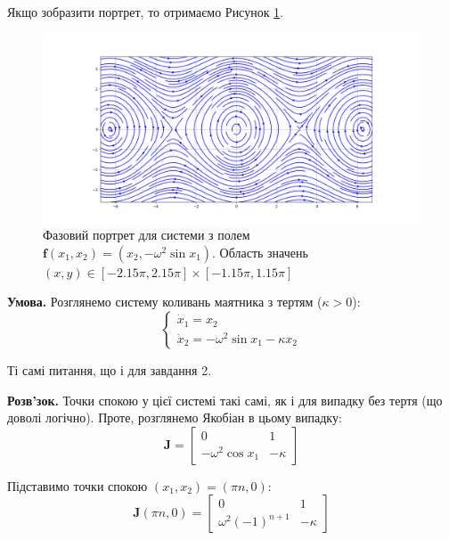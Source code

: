 \documentclass[oneside,solution]{tmpl}
\begin{document}
Якщо зобразити портрет, то отримаємо Рисунок \ref{fig:no_friction}.

\begin{figure}
    \centering
    \includegraphics[width=\textwidth]{images/hw_5/no_friction_portrait.png}
    \caption{Фазовий портрет для системи з полем $\boldsymbol{f}(x_1,x_2)=(x_2,-\omega^2 \sin x_1)$. Область значень $(x,y) \in [-2.15\pi, 2.15\pi] \times [-1.15\pi, 1.15\pi]$}
    \label{fig:no_friction}
\end{figure}


\textbf{Умова.} Розглянемо систему коливань маятника з тертям ($\kappa > 0$):
\begin{equation}
    \begin{cases}
        \dot{x}_1 = x_2 \\
        \dot{x}_2 = -\omega^2 \sin x_1 - \kappa x_2
    \end{cases}
\end{equation}

Ті самі питання, що і для завдання 2.

\textbf{Розв'зок.} Точки спокою у цієї системі такі самі, як і для випадку без тертя (що доволі логічно). Проте, розглянемо Якобіан в цьому випадку:
\begin{equation}
    \boldsymbol{J} = \begin{bmatrix}
        0 & 1 \\
        -\omega^2 \cos x_1 & -\kappa
    \end{bmatrix}
\end{equation}

Підставимо точки спокою $(x_1,x_2)=(\pi n, 0)$:
\begin{equation}
    \boldsymbol{J}(\pi n, 0) = \begin{bmatrix}
        0 & 1 \\ \omega^2 (-1)^{n+1} & -\kappa
    \end{bmatrix}
\end{equation}
\end{document}
